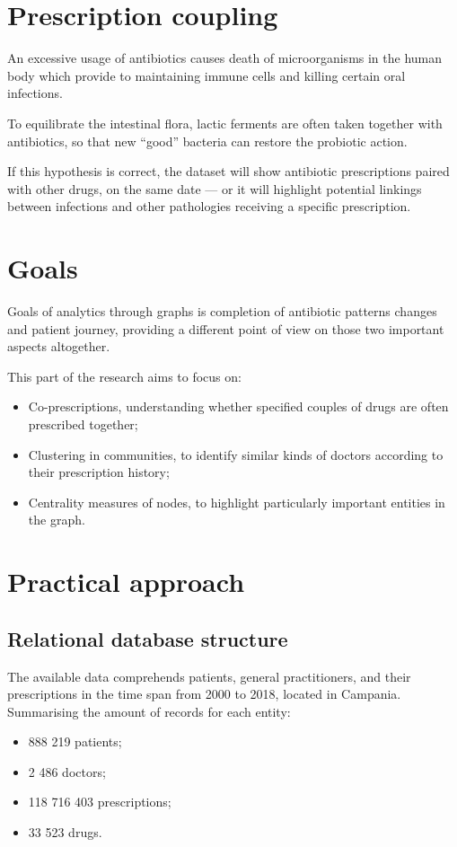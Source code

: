 \section{Prescription coupling}
An excessive usage of antibiotics causes death of microorganisms in the human body which provide to maintaining immune cells and killing certain oral infections\cite{bacteria}.

To equilibrate the intestinal flora, lactic ferments are often taken together with antibiotics, so that new ``good'' bacteria can restore the probiotic action.

If this hypothesis is correct, the dataset will show antibiotic prescriptions paired with other drugs, on the same date --- or it will highlight potential linkings between infections and other pathologies receiving a specific prescription.

\section{Goals}
Goals of analytics through graphs is completion of antibiotic patterns changes and patient journey, providing a different point of view on those two important aspects altogether.

This part of the research aims to focus on:
\begin{itemize}
	\item Co-prescriptions, understanding whether specified couples of drugs are often prescribed together;
	\item Clustering in communities, to identify similar kinds of doctors according to their prescription history;
	\item Centrality measures of nodes, to highlight particularly important entities in the graph.
\end{itemize}

\section{Practical approach}

\subsection{Relational database structure}
The available data comprehends patients, general practitioners, and their prescriptions in the time span from 2000 to 2018, located in Campania. Summarising the amount of records for each entity:
\begin{itemize}
	\item 888 219 patients;
	\item 2 486 doctors;
	\item 118 716 403 prescriptions;
	\item 33 523 drugs.
\end{itemize}

